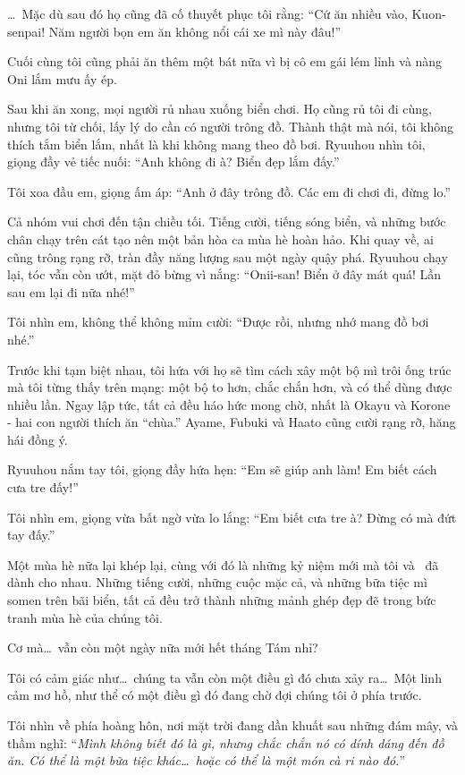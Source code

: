 \documentclass[../main.tex]{subfiles}
\begin{document}
\dots\ Mặc dù sau đó họ cũng đã cố thuyết phục tôi rằng: ``Cứ ăn nhiều vào, Kuon-senpai! Năm người bọn em ăn không nổi cái xe mì này đâu!''

Cuối cùng tôi cũng phải ăn thêm một bát nữa vì bị cô em gái lém lỉnh và nàng Oni lắm mưu ấy ép.

Sau khi ăn xong, mọi người rủ nhau xuống biển chơi. Họ cũng rủ tôi đi cùng, nhưng tôi từ chối, lấy lý do cần có người trông đồ. Thành thật mà nói, tôi không thích tắm biển lắm, nhất là khi không mang theo đồ bơi. Ryuuhou nhìn tôi, giọng đầy vẻ tiếc nuối: ``Anh không đi à? Biển đẹp lắm đấy.''

Tôi xoa đầu em, giọng ấm áp: ``Anh ở đây trông đồ. Các em đi chơi đi, đừng lo.''

Cả nhóm vui chơi đến tận chiều tối. Tiếng cười, tiếng sóng biển, và những bước chân chạy trên cát tạo nên một bản hòa ca mùa hè hoàn hảo. Khi quay về, ai cũng trông rạng rỡ, tràn đầy năng lượng sau một ngày quậy phá. Ryuuhou chạy lại, tóc vẫn còn ướt, mặt đỏ bừng vì nắng: ``Onii-san! Biển ở đây mát quá! Lần sau em lại đi nữa nhé!''

Tôi nhìn em, không thể không mỉm cười: ``Được rồi, nhưng nhớ mang đồ bơi nhé.''

Trước khi tạm biệt nhau, tôi hứa với họ sẽ tìm cách xây một bộ mì trôi ống trúc mà tôi từng thấy trên mạng: một bộ to hơn, chắc chắn hơn, và có thể dùng được nhiều lần. Ngay lập tức, tất cả đều háo hức mong chờ, nhất là Okayu và Korone - hai con người thích ăn ``chùa.'' Ayame, Fubuki và Haato cũng cười rạng rỡ, hăng hái đồng ý.

Ryuuhou nắm tay tôi, giọng đầy hứa hẹn: ``Em sẽ giúp anh làm! Em biết cách cưa tre đấy!''

Tôi nhìn em, giọng vừa bất ngờ vừa lo lắng: ``Em biết cưa tre à? Đừng có mà đứt tay đấy.''

Một mùa hè nữa lại khép lại, cùng với đó là những kỷ niệm mới mà tôi và \hll\ đã dành cho nhau. Những tiếng cười, những cuộc mặc cả, và những bữa tiệc mì somen trên bãi biển, tất cả đều trở thành những mảnh ghép đẹp đẽ trong bức tranh mùa hè của chúng tôi.

Cơ mà\dots\ vẫn còn một ngày nữa mới hết tháng Tám nhỉ?

Tôi có cảm giác như\dots\ chúng ta vẫn còn một điều gì đó chưa xảy ra\dots\ Một linh cảm mơ hồ, như thể có một điều gì đó đang chờ đợi chúng tôi ở phía trước.

Tôi nhìn về phía hoàng hôn, nơi mặt trời đang dần khuất sau những đám mây, và thầm nghĩ: ``\textit{Mình không biết đó là gì, nhưng chắc chắn nó có dính dáng đến đồ ăn. Có thể là một bữa tiệc khác\dots\ hoặc có thể là một món cà ri nào đó.}''
\end{document}
